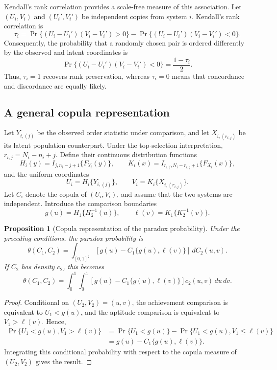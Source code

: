 \documentclass[12pt]{article}
\newtheorem{prop}[theorem]{Proposition}
\begin{document}
Kendall's rank correlation \citep{kendall1938new} provides a scale-free
measure of this association. Let \((U_i,V_i)\) and \((U_i',V_i')\) be
independent copies from system \(i\). Kendall's rank correlation is
\[
\tau_i
=
\Pr\{(U_i-U_i')(V_i-V_i')>0\}
-
\Pr\{(U_i-U_i')(V_i-V_i')<0\}.
\]
Consequently, the probability that a randomly chosen pair is ordered
differently by the observed and latent coordinates is
\[
\Pr\{(U_i-U_i')(V_i-V_i')<0\}=\frac{1-\tau_i}{2}.
\]
Thus, \(\tau_i=1\) recovers rank preservation, whereas \(\tau_i=0\) means
that concordance and discordance are equally likely. 

\subsection{A general copula representation}

Let \(Y_{i,(j)}\) be the observed order statistic under comparison, and let
\(X_{i,(r_{i,j})}\) be its latent population counterpart.  Under the top-selection
interpretation, \(r_{i,j}=N_i-n_i+j\).  Define their continuous distribution
functions
\[
H_i(y)=I_{j,n_i-j+1}\{F_{Y_i}(y)\},
\qquad
K_i(x)=I_{r_{i,j},N_i-r_{i,j}+1}\{F_{X_i}(x)\},
\]
and the uniform coordinates
\[
U_i=H_i\{Y_{i,(j)}\},
\qquad
V_i=K_i\{X_{i,(r_{i,j})}\}.
\]
Let \(C_i\) denote the copula of \((U_i,V_i)\), and assume that the two
systems are independent.  Introduce the comparison boundaries
\[
g(u)=H_1\{H_2^{-1}(u)\},
\qquad
\ell(v)=K_1\{K_2^{-1}(v)\}.
\]

\begin{prop}[Copula representation of the paradox probability]
\label{prop:general-copula-paradox}
Under the preceding conditions, the paradox probability is
\[
\theta(C_1,C_2)
=
\int_{[0,1]^2}
\left[g(u)-C_1\{g(u),\ell(v)\}\right]\,dC_2(u,v).
\]
If \(C_2\) has density \(c_2\), this becomes
\[
\theta(C_1,C_2)
=
\int_0^1\int_0^1
\left[g(u)-C_1\{g(u),\ell(v)\}\right]
c_2(u,v)\,du\,dv.
\]
\end{prop}

\begin{proof}
Conditional on \((U_2,V_2)=(u,v)\), the achievement comparison is equivalent
to \(U_1<g(u)\), and the aptitude comparison is equivalent to
\(V_1>\ell(v)\).  Hence,
\[
\begin{aligned}
\Pr\{U_1<g(u),V_1>\ell(v)\}
&=\Pr\{U_1<g(u)\}
  -\Pr\{U_1<g(u),V_1\leq\ell(v)\}\\
&=g(u)-C_1\{g(u),\ell(v)\}.
\end{aligned}
\]
Integrating this conditional probability with respect to the copula measure of
\((U_2,V_2)\) gives the result.
\end{proof}
\end{document}
